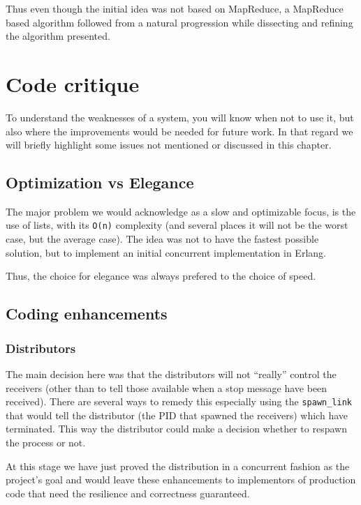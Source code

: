 \documentclass[a4paper,11pt]{report}
\begin{document}
Thus even though the initial idea was not based on MapReduce, a
MapReduce based algorithm followed from a natural progression while
dissecting and refining the algorithm presented.



\chapter{Code critique}

To understand the weaknesses of a system, you will know when not to
use it, but also where the improvements would be needed for future
work. In that regard we will briefly highlight some issues not
mentioned or discussed in this chapter.

\section{Optimization vs Elegance}
\label{sec:optimization-choices}

The major problem we would acknowledge as a slow and optimizable
focus, is the use of lists, with its \texttt{O(n)} complexity (and
several places it will not be the worst case, but the average
case). The idea was not to have the fastest possible solution, but to
implement an initial concurrent implementation in Erlang. 

Thus, the choice for elegance was always prefered to the choice of speed.

\section{Coding enhancements}
\subsection{Distributors}
\label{sec:codedist}

The main decision here was that the distributors will not ``really''
control the receivers (other than to tell those available when a stop
message have been received). There are several ways to remedy this
especially using the \texttt{spawn\_link} that would tell the
distributor (the PID that spawned the receivers) which have
terminated. This way the distributor could make a decision whether to
respawn the process or not. 

At this stage we have just proved the distribution in a concurrent
fashion as the project's goal and would leave these enhancements to
implementors of production code that need the resilience and
correctness guaranteed.
\end{document}
